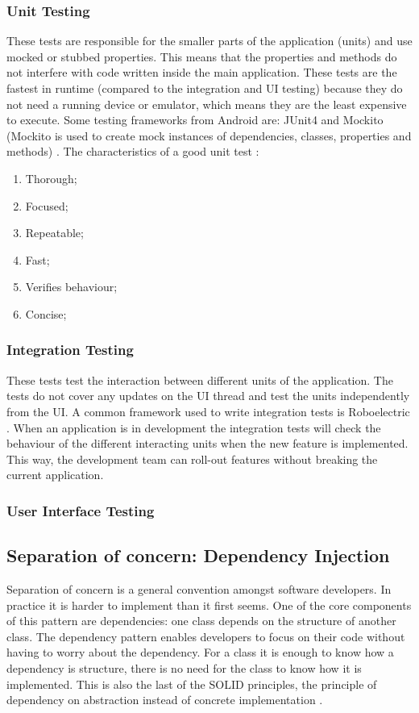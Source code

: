 \subsubsection{Unit Testing}
These tests are responsible for the smaller parts of the application (units) and use mocked or stubbed properties. This means that the properties and methods do not interfere with code written inside the main application. These tests are the fastest in runtime (compared to the integration and UI testing) because they do not need a running device or emulator, which means they are the least expensive to execute. Some testing frameworks from Android are: JUnit4 and Mockito (Mockito is used to create mock instances of dependencies, classes, properties and methods) \cite{FernandoSproviero2018}. The characteristics of a good unit test \cite{Google_testing2017}:
\begin{enumerate}
\item Thorough;
\item Focused;
\item Repeatable;
\item Fast;
\item Verifies behaviour;
\item Concise;
\end{enumerate}
\subsubsection{Integration Testing}
These tests test the interaction between different units of the application. The tests do not cover any updates on the UI thread and test the units independently from the UI. A common framework used to write integration tests is Roboelectric \cite{Roboelec2019}. When an application is in development the integration tests will check the behaviour of the different interacting units when the new feature is implemented. This way, the development team can roll-out features without breaking the current application.
\subsubsection{User Interface Testing}
\subsection{Separation of concern: Dependency Injection}
Separation of concern is a general convention amongst software developers. In practice it is harder to implement than it first seems. One of the core components of this pattern are dependencies: one class depends on the structure of another class. The dependency pattern enables developers to focus on their code without having to worry about the dependency. For a class it is enough to know how a dependency is structure, there is no need for the class to know how it is implemented. This is also the last of the SOLID principles, the principle of dependency on abstraction instead of concrete implementation \cite{BhavyaKaria2018}.
